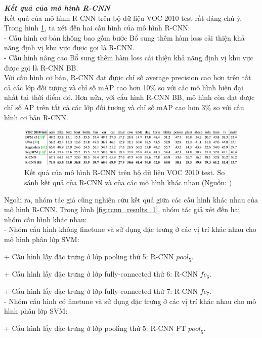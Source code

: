 {    \noindent
    \textbf{\textit{Kết quả của mô hình R-CNN}} \\
    Kết quả của mô hình R-CNN trên bộ dữ liệu VOC 2010 test rất đáng chú ý.
    Trong hình \ref{fig:rcnn_results_3}, ta xét đến hai cấu hình của mô hình R-CNN: \\
    - Cấu hình cơ bản không bao gồm bước Bổ sung thêm hàm loss cải thiện khả năng định vị khu vực được gọi là R-CNN. \\
    - Cấu hình nâng cao Bổ sung thêm hàm loss cải thiện khả năng định vị khu vực được gọi là R-CNN BB. \\
    Với cấu hình cơ bản, R-CNN đạt được chỉ số average precision cao hơn trên tất cả các lớp đối tượng  và chỉ số mAP cao hơn 10\% so với các mô hình hiện đại nhất tại thời điểm đó.
    Hơn nữa, với cấu hình R-CNN BB, mô hình còn đạt được chỉ số AP trên tất cả các lớp đối tượng  và chỉ số mAP cao hơn 3\% so với cấu hình cơ bản R-CNN.
    \begin{figure}[H]
        \centering
        \includegraphics[width=15cm] {images/rcnn_results_3}
        \caption{Kết quả của mô hình R-CNN trên bộ dữ liệu VOC 2010 test. So sánh kết quả của R-CNN và của các mô hình khác nhau (Nguồn: \cite{girshick2014rich})}
        \label{fig:rcnn_results_3}
    \end{figure}
    \noindent
    Ngoài ra, nhóm tác giả cũng nghiên cứu kết quả giữa các cấu hình khác nhau của mô hình R-CNN.
    Trong hình \ref{fig:rcnn_results_1}, nhóm tác giả xét đến hai nhóm cấu hình khác nhau: \\
    - Nhóm cấu hình không finetune và sử dụng đặc trưng ở các vị trí khác nhau cho mô hình phân lớp SVM: \par
    + Cấu hình lấy đặc trưng ở lớp pooling thứ 5: R-CNN ${pool}_{5}$. \par
    + Cấu hình lấy đặc trưng ở lớp fully-connected thứ 6: R-CNN ${fc}_{6}$. \par
    + Cấu hình lấy đặc trưng ở lớp fully-connected thứ 7: R-CNN ${fc}_{7}$. \\
    - Nhóm cấu hình có finetune và sử dụng đặc trưng ở các vị trí khác nhau cho mô hình phân lớp SVM: \par
    + Cấu hình lấy đặc trưng ở lớp pooling thứ 5: R-CNN FT ${pool}_{5}$. \par
}
